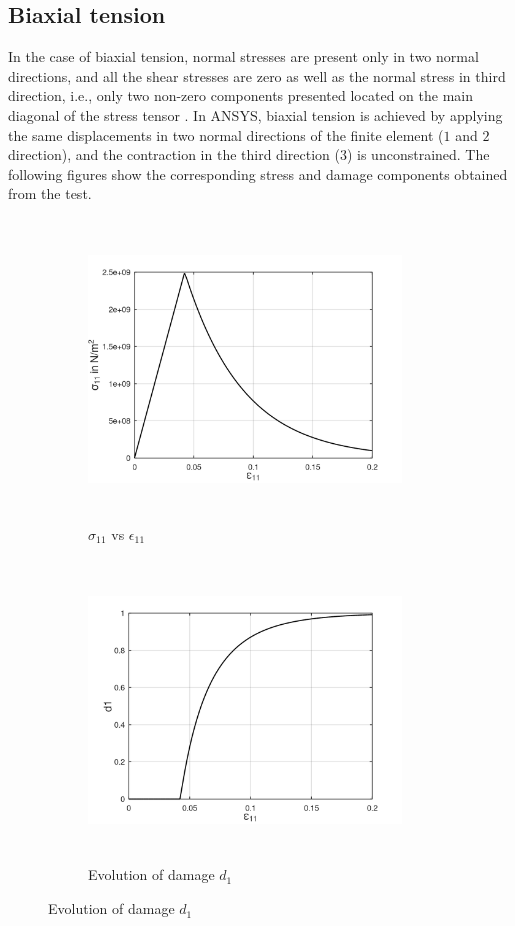 \documentclass[12pt,twoside]{report}
\begin{document}
\subsection{Biaxial tension}
\indent\indent\indent  In the case of biaxial tension, normal stresses are present only in two normal directions, and all the shear stresses are zero as well as the normal stress in third direction, i.e., only two non-zero components presented located on the main diagonal of the stress tensor . In ANSYS, biaxial tension is achieved by applying the same displacements in two normal directions of the finite element ($1$ and $2$ direction), and the contraction in the third direction ($3$) is unconstrained. The following figures show the corresponding stress and damage components obtained from the test.
\begin{figure}[hbt!]
     \captionsetup[subfigure]{justification=centering}
     \begin{subfigure}{0.4\textwidth}
         \includegraphics[width=8.3cm,height=8cm,keepaspectratio]{23.S11vsE11.png}
         \caption{$\sigma_{11}$ vs $\epsilon_{11}$}
         \label{fig:S11vsE11}
     \end{subfigure}
	\hspace{1.8cm}
     \captionsetup[subfigure]{justification=centering}
     \begin{subfigure}{0.4\textwidth}
         \includegraphics[width=8.3cm,height=8cm,keepaspectratio]{23.d1.png}
         \caption{Evolution of damage $d_{1}$}
         \label{fig:Evolution of damage d1}
     \end{subfigure}
\end{figure}
\end{document}
